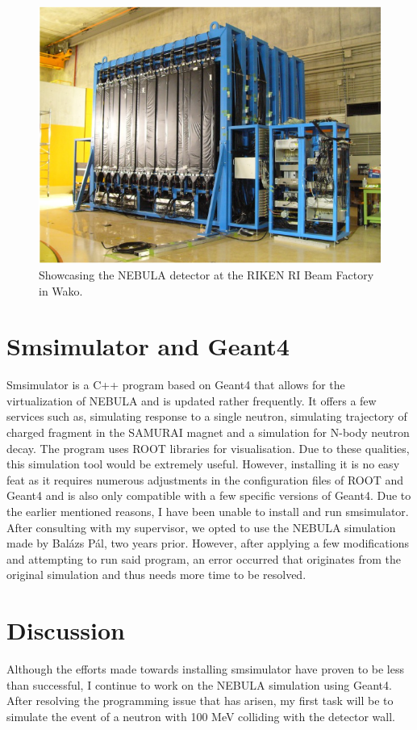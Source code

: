 \documentclass[12pt,twocolumn]{article}
\begin{document}
\begin{figure}[H]
    \centering
    \includegraphics[scale = 0.65]{nebulakep.png}
    \caption{Showcasing the NEBULA detector at the RIKEN RI Beam Factory in Wako. \cite{nebula}}
\end{figure}

\section{Smsimulator and Geant4}

Smsimulator is a C++ program based on Geant4 that allows for the virtualization of NEBULA and is updated rather frequently. \cite{smsim} It offers a few services such as, simulating response to a single neutron, simulating trajectory of charged fragment in the SAMURAI magnet and a simulation for N-body neutron decay. The program uses ROOT libraries for visualisation. Due to these qualities, this simulation tool would be extremely useful. However, installing it is no easy feat as it requires numerous adjustments in the configuration files of ROOT and Geant4 and is also only compatible with a few specific versions of Geant4. Due to the earlier mentioned reasons, I have been unable to install and run smsimulator. After consulting with my supervisor, we opted to use the NEBULA simulation made by Balázs Pál, two years prior. \cite{masterdesky} However, after applying a few modifications and attempting to run said program, an error occurred that originates from the original simulation and thus needs more time to be resolved.

\section{Discussion}

Although the efforts made towards installing smsimulator have proven to be less than successful, I continue to work on the NEBULA simulation using Geant4. \cite{geant} After resolving the programming issue that has arisen, my first task will be to simulate the event of a neutron with 100 MeV colliding with the detector wall.



\end{document}
